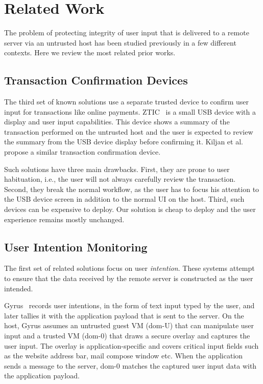 \section{Related Work}
\label{sec:relatedWork}

The problem of protecting integrity of user input that is delivered to a remote server via an untrusted host has been studied previously in a few different contexts. Here we review the most related prior works.

\subsection{Transaction Confirmation Devices} 

The third set of known solutions use a separate trusted device to confirm user input for transactions like online payments. ZTIC~\cite{weigold2011} is a small USB device with a display and user input capabilities. This device shows a summary of the transaction performed on the untrusted host and the user is expected to review the summary from the USB device display before confirming it. Kiljan et al.~\cite{6978928} propose a similar transaction confirmation device. 

Such solutions have three main drawbacks. First, they are prone to user habituation, i.e., the user will not always carefully review the transaction. Second, they break the normal workflow, as the user has to focus his attention to the USB device screen in addition to the normal UI on the host. Third, such devices can be expensive to deploy. Our solution is cheap to deploy and the user experience remains mostly unchanged. 



\subsection{User Intention Monitoring} 

The first set of related solutions focus on user \emph{intention}. These systems attempt to ensure that the data received by the remote server is constructed as the user intended. 

Gyrus~\cite{gyrus} records user intentions, in the form of text input typed by the user, and later tallies it with the application payload that is sent to the server. On the host, Gyrus assumes an untrusted guest VM (dom-U) that can manipulate user input and a trusted VM (dom-0) that draws a secure overlay and captures the user input. The overlay is application-specific and covers critical input fields such as the website address bar, mail compose window etc. When the application sends a message to the server, dom-0 matches the captured user input data with the application payload. 

